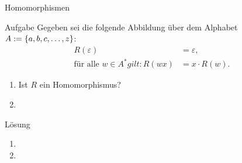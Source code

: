\begin{frame}{Homomorphismen}
	\begin{exampleblock}{Aufgabe}
		Gegeben sei die folgende Abbildung über dem Alphabet $A:=\left\{ a, b, c, \dots, z \right\}$:
		\begin{align*}
			R(\varepsilon) &= \varepsilon,\\
			\text{für alle } w \in A^* gilt: R(wx) &= x \cdot R(w).
		\end{align*}
		\begin{enumerate}
			\item Ist $R$ ein Homomorphismus?
			\item {}
		\end{enumerate}
	\end{exampleblock}

	\begin{block}{Lösung}
		\begin{enumerate}
			\item {}
			\item {}
		\end{enumerate}
	\end{block}
\end{frame}



